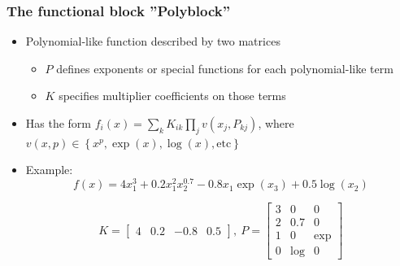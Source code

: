 \documentclass[mathserif]{beamer}
\begin{document}
\begin{frame}
\frametitle{The functional block ''Polyblock''}
\begin{itemize}
\item Polynomial-like function described by two matrices
\begin{itemize}
\item $P$ defines exponents or special functions for each polynomial-like term
\item $K$ specifies multiplier coefficients on those terms
\end{itemize}
\item Has the form $f_i(x)=\sum_k K_{ik} \prod_j
v(x_j, P_{kj})$, where  $v(x, p) \in \left \{ x^p , \exp(x) ,
\log(x), \text{etc} \right \}$
\item Example:
\begin{equation*}
f(x) = 4 x_1^3 + 0.2 x_1^2 x_2^{0.7} - 0.8 x_1 \exp(x_3) + 0.5 \log( x_2)
\label{eq:example_poly}
\end{equation*}

\begin{equation*}
K = \left[\begin{array}{cccc} 4 & 0.2 & -0.8 & 0.5 \end{array}\right] ,~
P = \left[\begin{array}{ccc} 3 & 0 & 0  \\ 2 & 0.7 & 0  \\ 1 & 0 & \exp  \\ 0 & \log & 0    \end{array}\right]
\label{eq:example_sparserep}
\end{equation*}
\end{itemize}
\end{frame}
\end{document}
